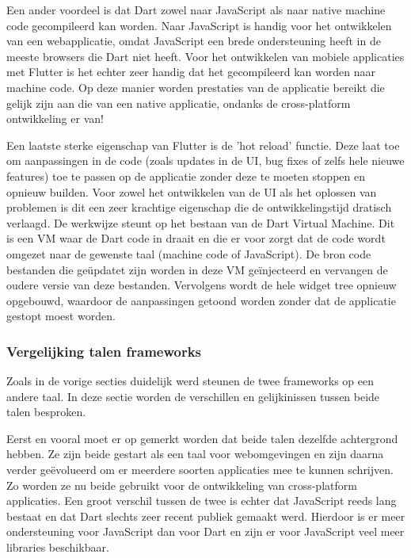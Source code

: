 Een ander voordeel is dat Dart zowel naar JavaScript als naar native machine
code gecompileerd kan worden. Naar JavaScript is handig voor het ontwikkelen van
een webapplicatie, omdat JavaScript een brede ondersteuning heeft in de meeste
browsers die Dart niet heeft. Voor het ontwikkelen van mobiele applicaties met
Flutter is het echter zeer handig dat het gecompileerd kan worden naar machine
code. Op deze manier worden prestaties van de applicatie bereikt die gelijk zijn
aan die van een native applicatie, ondanks de cross-platform ontwikkeling er
van!

Een laatste sterke eigenschap van Flutter is de 'hot reload' functie. Deze laat
toe om aanpassingen in de code (zoals updates in de UI, bug fixes of zelfs hele
nieuwe features) toe te passen op de applicatie zonder deze te moeten stoppen en
opnieuw builden. Voor zowel het ontwikkelen van de UI als het oplossen van
problemen is dit een zeer krachtige eigenschap die de ontwikkelingstijd dratisch
verlaagd. De werkwijze steunt op het bestaan van de Dart Virtual Machine. Dit is
een VM waar de Dart code in draait en die er voor zorgt dat de code wordt
omgezet naar de gewenste taal (machine code of JavaScript). De bron code
bestanden die geüpdatet zijn worden in deze VM geïnjecteerd en vervangen de
oudere versie van deze bestanden. Vervolgens wordt de hele widget tree opnieuw
opgebouwd, waardoor de aanpassingen getoond worden zonder dat de applicatie
gestopt moest worden.

\subsubsection{Vergelijking talen frameworks}
\label{subsubse:vglTalen}

Zoals in de vorige secties duidelijk werd steunen de twee frameworks op een
andere taal. In deze sectie worden de verschillen en gelijkinissen tussen beide
talen besproken.

Eerst en vooral moet er op gemerkt worden dat beide talen dezelfde achtergrond
hebben. Ze zijn beide gestart als een taal voor webomgevingen en zijn daarna
verder geëvolueerd om er meerdere soorten applicaties mee te kunnen schrijven.
Zo worden ze nu beide gebruikt voor de ontwikkeling van cross-platform
applicaties. Een groot verschil tussen de twee is echter dat JavaScript reeds
lang bestaat en dat Dart slechts zeer recent publiek gemaakt werd. Hierdoor is
er meer ondersteuning voor JavaScript dan voor Dart en zijn er voor JavaScript
veel meer libraries beschikbaar.

